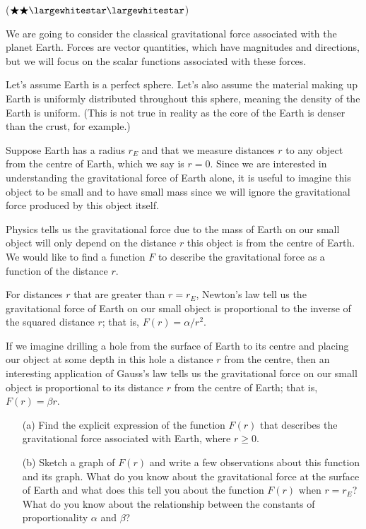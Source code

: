 \documentclass{exam}
\begin{document}
\begin{questions}\setcounter{question}{1} 

\question\label{original} ($\bigstar\bigstar\largewhitestar\largewhitestar$)

We are going to consider the classical gravitational force associated with the planet Earth. Forces are vector quantities, which have magnitudes and directions, but we will focus on the scalar functions associated with these forces. 

Let's assume Earth is a perfect sphere. Let's also assume the material making up Earth is uniformly distributed throughout this sphere, meaning the density of the Earth is uniform. (This is not true in reality as the core of the Earth is denser than the crust, for example.) 

Suppose Earth has a radius $r_E$ and that we measure distances $r$ to any object from the centre of Earth, which we say is $r=0$. Since we are interested in understanding the gravitational force of Earth alone, it is useful to imagine this object to be small and to have small mass since we will ignore the gravitational force produced by this object itself.

Physics tells us the gravitational force due to the mass of Earth on our small object will only depend on the distance $r$ this object is from the centre of Earth.  We would like to find a function $F$ to describe the gravitational force as a function of the distance $r$. 

For distances $r$ that are greater than $r=r_E$, Newton's law tell us the gravitational force of Earth on our small object is proportional to the inverse of the squared distance $r$; that is, $F(r)=\alpha/r^2$.

If we imagine drilling a hole from the surface of Earth to its centre and placing our object at some depth in this hole a distance $r$ from the centre, then an interesting application of Gauss's law tells us the gravitational force on our small object is proportional to its distance $r$ from the centre of Earth; that is, $F(r)=\beta r$.

\begin{enumerate}

\item[(a)] Find the explicit expression of the function $F(r)$ that describes the gravitational force associated with Earth, where $r\geq 0$. 


\item[(b)] Sketch a graph of $F(r)$ and write a few observations about this function and its graph. What do you know about the gravitational force at the surface of Earth and what does this tell you about the function $F(r)$ when $r=r_E$? What do you know about the relationship between the constants of proportionality $\alpha$ and $\beta$?


\end{enumerate}
\end{questions}
\end{document}
